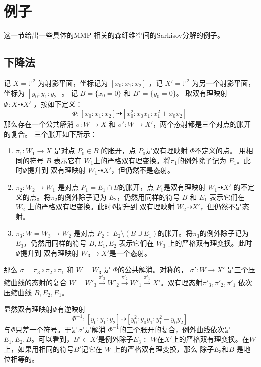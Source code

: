 \section{例子}
这一节给出一些具体的MMP-相关的森纤维空间的Sarkisov分解的例子。

\subsection{下降法}\label{example1}
记 $ X=\mathbb{P}^2 $ 为射影平面，坐标记为 $ [ x_0:x_1:x_2 ] $ ，记 $ X'=\mathbb{P}^2 $ 为另一个射影平面，坐标为 $ [ y_0:y_1:y_2 ] $。
记 $ B=\{x_0=0\} $ 和 $B'=\{y_{0}=0\} $。
取双有理映射 $ \Phi:X\dashrightarrow X' $ ，按如下定义：
\[ \Phi:[x_0:x_1:x_2]\dashrightarrow [x_0^2:x_0x_1:x_1^2+x_0x_2] \]
那么存在一个公共解消 $\sigma: W\to X$ 和 $\sigma':W\to X'$，两个态射都是三个对点的胀开的复合。
三个胀开如下所示：
\begin{enumerate}
  \item $\pi_{1}:W_{1}\to X$ 是对点 $P_{0} \in B$ 的胀开，点 $P_{0}$是双有理映射  $\Phi$不定义的点。 用相同的符号 $B$ 表示它在  $W_{1}$上的严格双有理变换。将$\pi_{1}$的例外除子记为 $E_{1}$。此时$\Phi$提升到 双有理映射 $W_{1}\dashrightarrow X'$，但仍然不是态射。
  \item $\pi_{2}:W_{2}\to W_{1}$ 是对点 $P_{1}=E_{1} \cap B$的胀开，点 $P_{1}$是双有理映射 $  W_{1}\dashrightarrow X' $
的不定义的点。将$\pi_{2}$的例外除子记为 $E_{2}$，仍然用同样的符号 $B$ 和 $E_{1}$ 表示它们在 $W_{2}$ 上的严格双有理变换。此时$\Phi$提升到 双有理映射 $W_{2}\dashrightarrow X'$，但仍然不是态射。
  \item $\pi_{3}:W=W_{3}\to W_{2}$ 是对点 $P_{2} \in E_{2} \setminus (B\cup E_{1})$的胀开。将$\pi_{3}$的例外除子记为 $E_{3}$，仍然用同样的符号 $B,E_{1},E_{2}$ 表示它们在 $W_{3}$ 上的严格双有理变换。此时$\Phi$提升到 双有理映射 $W_{3}\to  X'$是一个态射。
\end{enumerate}
那么 $ \sigma=\pi_{3}\circ \pi_{2} \circ \pi_{1} $ 和 $ W=W_3 $ 是 $\Phi$的公共解消。对称的， $ \sigma':W\to X' $ 是三个压缩曲线的态射的复合  $W=W'_{3}\xrightarrow{\pi'_{3}} W'_{2}\xrightarrow{\pi'_{2}} W'_{1} \xrightarrow{\pi'_{1}} X'$。双有理态射$\pi'_{3},\pi'_{2},\pi'_{1}$ 依次压缩曲线 $ B,E_2,E_1 $。
\begin{remark}
  显然双有理映射$\Phi$有逆映射
\[ \Phi^{-1}:[y_0:y_1:y_2]\dashrightarrow [y_0^2:y_0y_1:y_1^2-y_0y_2] \]
与$\Phi $只差一个符号。于是$\sigma' $是解消 $\Phi^{-1}$的三个胀开的复合，例外曲线依次是$E_{1},E_{2},B$。可以看到，$B' \subset X'$是例外除子$E_{3} \subset W$在$X'$上的严格双有理变换。在$W$ 上，如果用相同的符号$B'$记它在 $W$ 上的严格双有理变换，那么 除子$E_{3}$和$B$ 是地位相等的。
\end{remark}
